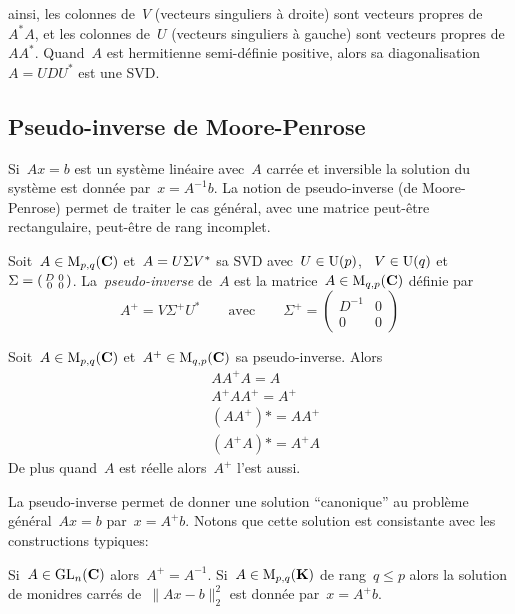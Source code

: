 ainsi, les colonnes de~$V$ (vecteurs singuliers à droite) sont vecteurs
propres de~$A^*A$, et les colonnes de~$U$ (vecteurs singuliers à gauche) sont
vecteurs propres de~$AA^*$.
Quand~$A$ est hermitienne semi-définie positive, alors sa
diagonalisation~$A=UDU^*$ est une SVD.


\subsection{Pseudo-inverse de Moore-Penrose}

Si~$Ax=b$ est un système linéaire avec~$A$ carrée et inversible la solution
du système est donnée par~$x=A^{-1}b$.  La notion de pseudo-inverse (de
Moore-Penrose) permet de traiter le cas général, avec une matrice peut-être
rectangulaire, peut-être de rang incomplet.

\begin{definition}
	\label{def:pseudoinv}
	Soit~$A\in\mathrm{M}_{p,q}(\mathbf{C})$ et~$A=U\/\Sigma V^*$ sa SVD
	avec~$U\in\mathrm{U}(p)$, ~$V\in\mathrm{U}(q)$
	et~$\Sigma=\left(\begin{smallmatrix}D&0\\0&0\end{smallmatrix}\right)$.
	La~\emph{pseudo-inverse} de~$A$ est la matrice~$A\in\mathrm{M}_{q,p}(\mathbf{C})$ définie
	par
	\[
		A^+=V\Sigma^+ U^*
		\qquad
		\textrm{avec}
		\qquad
		\Sigma^+=\begin{pmatrix}D^{-1}&0\\0&0\end{pmatrix}
	\]
\end{definition}

\begin{exercice}
	\label{ex:pseudoinv}
	Soit~$A\in\mathrm{M}_{p,q}(\mathbf{C})$ et~$A^+\in\mathrm{M}_{q,p}(\mathbf{C})$ sa pseudo-inverse.  Alors
	\begin{align*}
		& AA^+A=A \\
		& A^+AA^+=A^+ \\
		& (AA^+)*=AA^+ \\
		& (A^+A)*=A^+A
	\end{align*}
	De plus quand~$A$ est réelle alors~$A^+$ l'est aussi.
\end{exercice}

La pseudo-inverse permet de donner une solution ``canonique'' au problème
général~$Ax=b$ par~$x=A^+b$.  Notons que cette solution est consistante avec
les constructions typiques:

\begin{exercice}
	Si~$A\in\mathrm{GL}_n(\mathbf{C})$ alors~$A^+=A^{-1}$.
	Si~$A\in\mathrm{M}_{p,q}(\mathbf{K})$ de rang~$q\le p$ alors la solution de monidres carrés
	de~$\|Ax-b\|^2_2$ est donnée par~$x=A^+b$.
\end{exercice}

